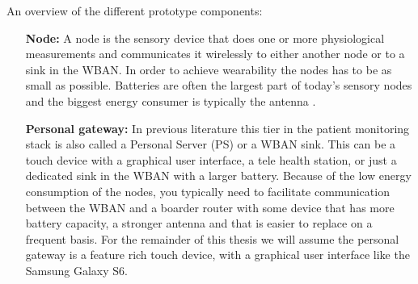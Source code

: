 
An overview of the different prototype components:
\begin{itemize}

  \item[\textbf{Node:}] A node is the sensory device that does one or more physiological measurements and communicates it wirelessly to either another node or to a sink in the WBAN. In order to achieve wearability the nodes has to be as small as possible. Batteries are often the largest part of today’s sensory nodes and the biggest energy consumer is typically the antenna \cite{Ullah:2010ci}.


  \item[\textbf{Personal gateway:}] In previous literature this tier in the patient monitoring stack is also called a Personal Server (PS) or a WBAN sink. This can be a touch device with a graphical user interface, a tele health station, or just a dedicated sink in the WBAN with a larger battery. Because of the low energy consumption of the nodes, you typically need to facilitate communication between the WBAN and a boarder router with some device that has more battery capacity, a stronger antenna and that is easier to replace on a frequent basis. For the remainder of this thesis we will assume the personal gateway is a feature rich touch device, with a graphical user interface like the Samsung Galaxy S6.



\end{itemize}
